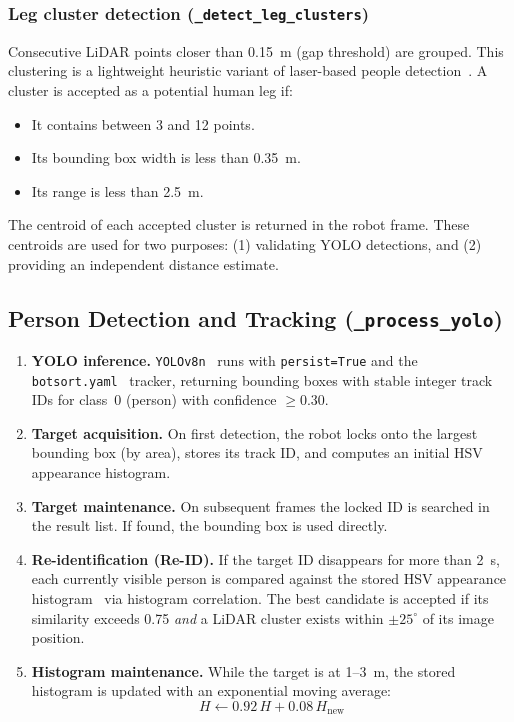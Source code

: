 \documentclass[12pt,a4paper]{article}
\begin{document}
\subsubsection*{Leg cluster detection (\texttt{\_detect\_leg\_clusters})}
Consecutive LiDAR points closer than 0.15~m (gap threshold) are grouped.
This clustering is a lightweight heuristic variant of laser-based people
detection~\cite{arras}.
A cluster is accepted as a potential human leg if:
\begin{itemize}
  \item It contains between 3 and 12 points.
  \item Its bounding box width is less than 0.35~m.
  \item Its range is less than 2.5~m.
\end{itemize}
The centroid of each accepted cluster is returned in the robot frame.
These centroids are used for two purposes: (1) validating YOLO detections,
and (2) providing an independent distance estimate.

\subsection{Person Detection and Tracking (\texttt{\_process\_yolo})}

\begin{enumerate}[leftmargin=*, label=\arabic*.]
  \item \textbf{YOLO inference.} \texttt{YOLOv8n}~\cite{yolo,yolov8} runs with \texttt{persist=True}
    and the \texttt{botsort.yaml}~\cite{sort,botsort} tracker, returning bounding boxes with stable
    integer track IDs for class~0 (person) with confidence $\geq 0.30$.

  \item \textbf{Target acquisition.} On first detection, the robot locks onto
    the largest bounding box (by area), stores its track ID, and computes an
    initial HSV appearance histogram.

  \item \textbf{Target maintenance.} On subsequent frames the locked ID is
    searched in the result list. If found, the bounding box is used directly.

  \item \textbf{Re-identification (Re-ID).} If the target ID disappears for
    more than 2~s, each currently visible person is compared against the
    stored HSV appearance histogram~\cite{comaniciu} via histogram correlation.  The best candidate is
    accepted if its similarity exceeds 0.75 \emph{and} a LiDAR cluster exists
    within $\pm25^{\circ}$ of its image position.

  \item \textbf{Histogram maintenance.} While the target is at 1--3~m, the
    stored histogram is updated with an exponential moving average:
    \[
      H \leftarrow 0.92\,H + 0.08\,H_\text{new}
    \]
\end{enumerate}
\end{document}
